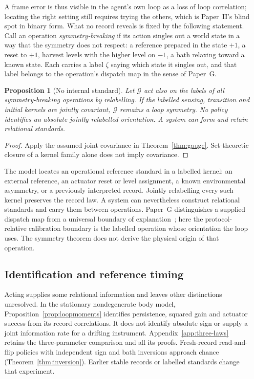 \documentclass[12pt]{article}
\newtheorem{proposition}[theorem]{Proposition}
\theoremstyle{definition}
\begin{document}
A frame error is thus visible in the agent's own loop as a loss of loop correlation; locating the right setting still requires trying the others, which is Paper~II's blind spot in binary form. What no record reveals is fixed by the following statement. Call an operation \emph{symmetry-breaking} if its action singles out a world state in a way that the symmetry does not respect: a reference prepared in the state $+1$, a reset to $+1$, harvest levels with the higher level on $-1$, a bath relaxing toward a known state. Each carries a label $\zeta$ saying which state it singles out, and that label belongs to the operation's dispatch map in the sense of Paper~G.

\begin{proposition}[No internal standard]
\label{prop:nostandard}
Let $\mathcal G$ act also on the labels of all symmetry-breaking operations by relabelling. If the labelled sensing, transition and initial kernels are jointly covariant, $\mathcal G$ remains a loop symmetry. No policy identifies an absolute jointly relabelled orientation. A system can form and retain relational standards.
\end{proposition}

\begin{proof}
Apply the assumed joint covariance in Theorem~\ref{thm:gauge}. Set-theoretic closure of a kernel family alone does not imply covariance.
\end{proof}

The model locates an operational reference standard in a labelled kernel: an external reference, an actuator reset or level assignment, a known environmental asymmetry, or a previously interpreted record. Jointly relabelling every such kernel preserves the record law. A system can nevertheless construct relational standards and carry them between operations. Paper~G distinguishes a supplied dispatch map from a universal boundary of explanation~\cite{Liu2026HAFF_G}; here the protocol-relative calibration boundary is the labelled operation whose orientation the loop uses. The symmetry theorem does not derive the physical origin of that operation.

\subsection{Identification and reference timing}

Acting supplies some relational information and leaves other
distinctions unresolved. In the stationary nondegenerate body model,
Proposition~\ref{prop:loopmoments} identifies persistence, squared
gain and actuator success from its record correlations.
It does not identify absolute sign or supply a joint information
rate for a drifting instrument.
Appendix~\ref{app:three-laws} retains the three-parameter comparison
and all its proofs.
Fresh-record read-and-flip policies with independent sign and bath
inversions approach chance (Theorem~\ref{thm:inversion}).
Earlier stable records or labelled standards change that experiment.
\end{document}
